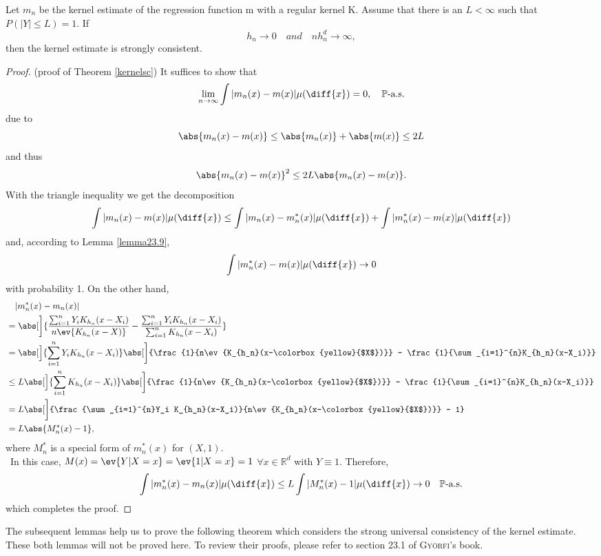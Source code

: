\begin{theorem} \label{kernelsc}
Let $m_n$ be the kernel estimate of the regression function m with a regular kernel K. Assume that there is an $L<\infty$ such that $P(|Y| \leq L) = 1.$ If \[h_n \to 0 \quad and \quad nh_n^d \to \infty,\] then the kernel estimate is strongly consistent.
\end{theorem}
\begin{proof}
(proof of Theorem \ref{kernelsc}) It suffices to show that \[\lim_{n\to\infty} \int |m_n(x)-m(x)| \mu(\diff{x}) = 0,\quad \mathbb{P}\text{-a.s.}\] due to
\[
    \abs{m_n(x) - m(x)} \leq \abs{m_n(x)} + \abs{m(x)} \leq 2L
\]
and thus
\[
    \abs{m_n(x) - m(x)}^2 \leq 2L \abs{m_n(x) - m(x)}.
\]
With the triangle inequality we get the decomposition \[\int |m_n(x)-m(x)| \mu(\diff{x}) \leq \int |m_n(x)-m_n^*(x)| \mu(\diff{x}) + \int |m_n^*(x)-m(x)| \mu(\diff{x})\]
and, according to Lemma \ref{lemma23.9}, \[\int |m_n^*(x)-m(x)| \mu(\diff{x}) \to 0 \] with probability 1.
On the other hand, 
\begin{align*}
&\quad |m_n^*(x)-m_n(x)| \\
&= \abs[\bigg]{\frac{\sum_{i=1}^{n}Y_i K_{h_n}(x-X_i)}{n\ev{K_{h_n}(x-X)}} - 
\frac{\sum_{i=1}^{n}Y_i K_{h_n}(x-X_i)}{\sum_{i=1}^{n}K_{h_n}(x-X_i)}} \\
&= \abs[\Big]{\sum_{i=1}^{n}Y_i K_{h_n}(x-X_i)}
\abs[\bigg]{\frac{1}{n\ev{K_{h_n}(x-\colorbox{yellow}{$X$})}} - \frac{1}{\sum_{i=1}^{n}K_{h_n}(x-X_i)}} \\
&\leq L \abs[\Big]{\sum_{i=1}^{n}K_{h_n}(x-X_i)}
\abs[\bigg]{\frac{1}{n\ev{K_{h_n}(x-\colorbox{yellow}{$X$})}} - \frac{1}{\sum_{i=1}^{n}K_{h_n}(x-X_i)}} \\
&= L \abs[\bigg]{\frac{\sum_{i=1}^{n}Y_i K_{h_n}(x-X_i)}{n\ev{K_{h_n}(x-\colorbox{yellow}{$X$})}} - 1} \\
&= L \abs{M_n^*(x)-1},
\end{align*}
where $M_n^*$ is a special form of $m_n^*(x)$ for $(X,1)$. \\\
In this case, $M(x) = \ev{Y|X=x} = \ev{1|X=x} = 1$ $ \forall x \in \mathbb{R}^d$ with $Y \equiv 1$.
Therefore, 
\[
\int|m_n^*(x)-m_n(x)| \mu(\diff{x}) \leq L \int |M_n^*(x)-1| \mu(\diff{x}) \to 0 \quad \mathbb{P}\text{-a.s.}
\]
which completes the proof.
\end{proof}

The subsequent lemmas help us to prove the following theorem which considers the strong universal consistency of the kernel estimate. These both lemmas will not be proved here. To review their proofs, please refer to section 23.1 of \textsc{Györfi}'s book.

